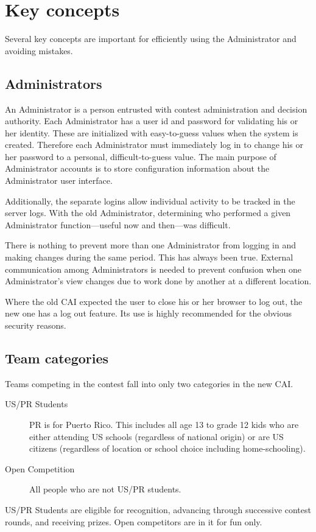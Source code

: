 \documentclass[11pt,letterpaper]{refart}
\begin{document}
\section{Key concepts}
Several key concepts are important for efficiently using the Administrator
and avoiding mistakes.

\subsection{Administrators}
An Administrator is a person entrusted with contest administration and decision authority.  
Each Administrator has a user id and password for validating his or her identity. These 
are initialized with easy-to-guess values when the system is 
created. Therefore each Administrator must immediately log in to change his or her password 
to a personal, difficult-to-guess value. The main purpose of Administrator accounts is to
store configuration information about the Administrator user interface.  

Additionally, the separate logins allow individual activity to be tracked in the server logs.  
With the old Administrator, determining who performed a given Administrator 
function---useful now and then---was difficult.

There is nothing to prevent more than one Administrator from logging in 
and making changes during the same period.  This has always been true.  
External communication among Administrators is needed to prevent
confusion when one Administrator's view changes due to work done by
another at a different location.

Where the old CAI expected the user to close his or her browser to log out, the
new one has a log out feature. Its use is highly recommended for the obvious
security reasons.

\subsection{Team categories}
Teams competing in the contest fall into only two categories in the new CAI.
\begin{description}
\item[US/PR Students]  PR is for Puerto Rico.  This includes all age 13 to grade 12
kids who are either attending US schools (regardless of national origin) or are
US citizens (regardless of location or school choice including home-schooling).
\item[Open Competition]  All people who are not US/PR students.
\end{description}
US/PR Students are eligible for recognition, advancing through successive
contest rounds, and receiving prizes.  Open competitors are in it for fun only.
\end{document}
